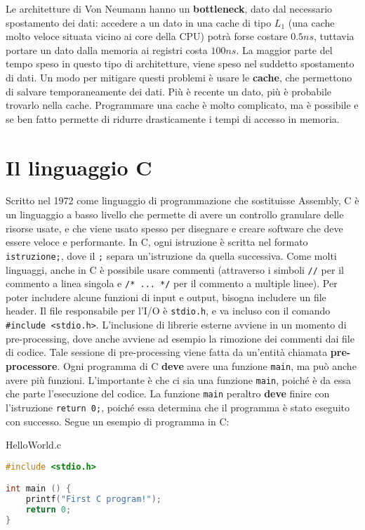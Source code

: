 Le architetture di Von Neumann hanno un \textbf{bottleneck}, dato dal necessario spostamento dei dati: accedere a un dato in una cache di tipo $L_1$ (una cache molto veloce situata vicino ai core della CPU) potrà forse costare $0.5ns$, tuttavia portare un dato dalla memoria ai registri costa $100ns$. La maggior parte del tempo speso in questo tipo di architetture, viene speso nel suddetto spostamento di dati.
\nwl
Un modo per mitigare questi problemi è usare le \textbf{cache}, che permettono di salvare temporaneamente dei dati. Più è recente un dato, più è probabile trovarlo nella cache. Programmare una cache è molto complicato, ma è possibile e se ben fatto permette di ridurre drasticamente i tempi di accesso in memoria.

\section{Il linguaggio C}

Scritto nel 1972 come linguaggio di programmazione che sostituisse Assembly, C è un linguaggio a basso livello che permette di avere un controllo granulare delle risorse usate, e che viene usato spesso per disegnare e creare software che deve essere veloce e performante. In C, ogni istruzione è scritta nel formato \verb|istruzione;|, dove il \texttt{;} separa un'istruzione da quella successiva. Come molti linguaggi, anche in C è possibile usare commenti (attraverso i simboli \verb|//| per il commento a linea singola e \verb|/* ... */| per il commento a multiple linee).
\nwl
Per poter includere alcune funzioni di input e output, bisogna includere un file header. Il file responsabile per l'I/O è \verb|stdio.h|, e va incluso con il comando \verb|#include <stdio.h>|. L'inclusione di librerie esterne avviene in un momento di pre-processing, dove anche avviene ad esempio la rimozione dei commenti dai file di codice. Tale sessione di pre-processing viene fatta da un'entità chiamata \textbf{pre-processore}.
\nwl
Ogni programma di C \textbf{deve} avere una funzione \verb|main|, ma può anche avere più funzioni. L'importante è che ci sia una funzione \verb|main|, poiché è da essa che parte l'esecuzione del codice. La funzione \verb|main| peraltro \textbf{deve} finire con l'istruzione \verb|return 0;|, poiché essa determina che il programma è stato eseguito con successo. Segue un esempio di programma in C:

\begin{codeblock}{HelloWorld.c}
    \begin{lstlisting}[language = c]
#include <stdio.h>

int main () {
    printf("First C program!");
    return 0;
}\end{lstlisting}
\end{codeblock}

